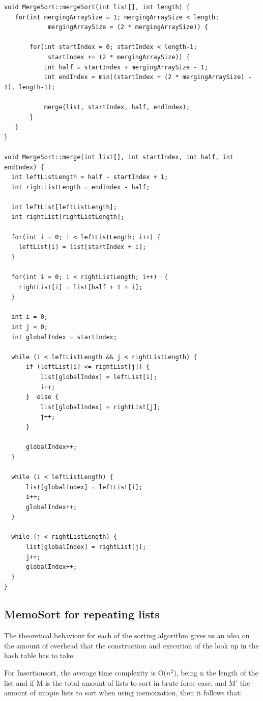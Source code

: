 \documentclass[a4paper,12pt]{article}
\begin{document}
\begin{verbatim}
void MergeSort::mergeSort(int list[], int length) {
   for(int mergingArraySize = 1; mergingArraySize < length;
    		mergingArraySize = (2 * mergingArraySize)) { 

       for(int startIndex = 0; startIndex < length-1; 
       		startIndex += (2 * mergingArraySize)) { 
           int half = startIndex + mergingArraySize - 1; 
           int endIndex = min((startIndex + (2 * mergingArraySize) - 1), length-1);

           merge(list, startIndex, half, endIndex); 
       } 
   } 
}

void MergeSort::merge(int list[], int startIndex, int half, int endIndex) {
  int leftListLength = half - startIndex + 1; 
  int rightListLength = endIndex - half; 
  
  int leftList[leftListLength];
  int rightList[rightListLength]; 

  for(int i = 0; i < leftListLength; i++) {
    leftList[i] = list[startIndex + i]; 
  }

  for(int i = 0; i < rightListLength; i++)  {
    rightList[i] = list[half + 1 + i]; 
  }

  int i = 0;
  int j = 0;
  int globalIndex = startIndex; 

  while (i < leftListLength && j < rightListLength) { 
      if (leftList[i] <= rightList[j]) { 
          list[globalIndex] = leftList[i]; 
          i++; 
      }  else { 
          list[globalIndex] = rightList[j]; 
          j++; 
      } 
      
      globalIndex++; 
  } 
  
  while (i < leftListLength) { 
      list[globalIndex] = leftList[i]; 
      i++; 
      globalIndex++; 
  } 

  while (j < rightListLength) { 
      list[globalIndex] = rightList[j]; 
      j++; 
      globalIndex++; 
  }
}
\end{verbatim}

\subsection{MemoSort for repeating lists}

The theoretical behaviour for each of the sorting algorithm gives us an idea on the amount of overhead that the construction and  execution of the look up in the hash table has to take. 

For Insertionsort, the average time complexity is O($n^2$), being n the length of the list and if M is the total amount of lists to sort in brute force case, and M$'$ the amount of unique lists to sort when using memoization, then it follows that:
\end{document}
